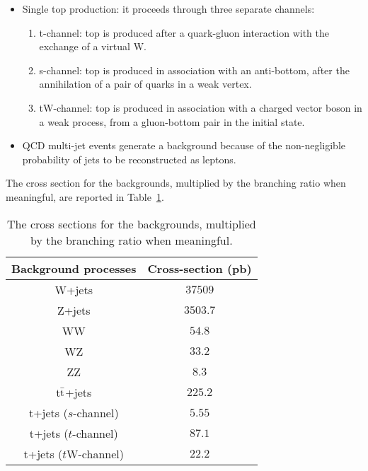 \begin{itemize}
  \item Single top production: it proceeds through three separate channels:
       \begin{enumerate}
         \item t-channel: top is produced after a quark-gluon interaction 
               with the exchange of a virtual W.
         \item s-channel: top is produced in association with an anti-bottom, 
               after the annihilation of a pair of quarks in a weak vertex.
         \item tW-channel: top is produced in association with a charged vector boson in a weak process, 
               from a gluon-bottom pair in the initial state.
       \end{enumerate}
  \item QCD multi-jet events generate a background 
       because of the non-negligible probability of jets to be reconstructed as leptons.
\end{itemize}
The cross section for the backgrounds, multiplied by the branching ratio when meaningful, 
are reported in Table~\ref{tab:bkg_XS}. 
\begin{table}[htbp!]
  \begin{center}
  \begin{tabular}{c|c}
  \hline  \hline
  Background processes & Cross-section (pb) \\
  \hline
  W+jets                        & $37509$ \\
  Z+jets                        & $3503.7$ \\
  WW                         & $54.8$ \\
  WZ                         & $33.2$ \\
  ZZ                         & $8.3$\\
  t$\bar{\textnormal{t}}$+jets  & $225.2$ \\
  t+jets ($s$-channel)          & $5.55$ \\
  t+jets ($t$-channel)          & $87.1$\\
  t+jets ($t$W-channel)         & $22.2$ \\
  \hline  \hline
  \end{tabular}
  \end{center}
  \caption{The cross sections for the backgrounds, multiplied by the branching ratio when meaningful.}
  \label{tab:bkg_XS}
\end{table}%
